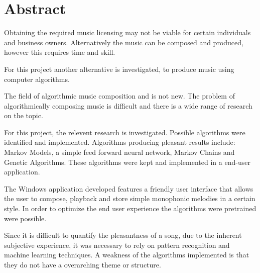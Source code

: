 \begingroup
\let\clearpage\relax
\let\cleardoublepage\relax
\let\cleardoublepage\relax

\chapter*{Abstract}
Obtaining the required music licensing may not be viable for certain individuals and business owners. Alternatively the music can be composed and produced, however this requires time and skill.

For this project another alternative is investigated, to produce music using computer algorithms. 

The field of algorithmic music composition and is not new. The problem of algorithmically composing music is difficult and there is a wide range of research on the topic.

For this project, the relevent research is investigated. Possible algorithms were identified and implemented. Algorithms producing pleasant results include: Markov Models, a simple feed forward neural network, Markov Chains and Genetic Algorithms. These algorithms were kept and implemented in a end-user application. 

The Windows application developed features a friendly user interface that allows the user to compose, playback and store simple monophonic melodies in a certain style. In order to optimize the end user experience the algorithms were pretrained were possible.

Since it is difficult to quantify the pleasantness of a song, due to the inherent subjective experience, it was necessary to rely on pattern recognition and machine learning techniques. A weakness of the algorithms implemented is that they do not have a overarching theme or structure. 



\vfill



\endgroup			

\vfill